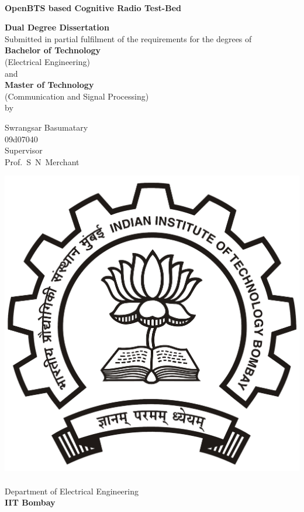 \begin{titlepage}
\begin{center}
\begin{spacing}{1.0}


~\\[0.3cm]
{ \LARGE \bfseries OpenBTS based Cognitive Radio Test-Bed\\[1.2cm] }

\textbf{\large Dual Degree Dissertation}\\[1.2cm]

{Submitted in partial fulfilment of the requirements for the degrees 
of\\[0.1cm]
\textbf{Bachelor of Technology} \\[0.1cm]
(Electrical Engineering) \\[0.1cm]
and \\[0.1cm]
\textbf{Master of Technology}\\[0.1cm]
(Communication and Signal Processing) \\[0.3cm]
by\\[0.3cm]}

{\LARGE Swrangsar Basumatary \\[0.1cm]}
{09d07040 \\[1cm]}
{Supervisor \\[0.1cm]}
{\LARGE Prof.~S~N~Merchant \\[1.5cm]}

\includegraphics[width=0.21\textheight]{../images/iitbLogo}~\\[0.9cm]
Department of Electrical Engineering\\[0.2cm]
\textbf{\large IIT Bombay}\\[0.9cm]





\end{spacing}
\end{center}
\end{titlepage}
